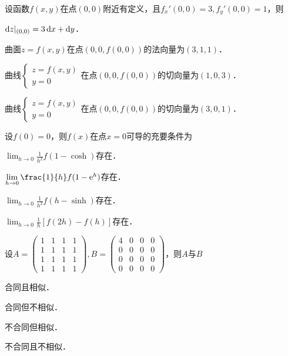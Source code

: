 \documentclass[plain,noanswer,medmath]{../../template/jnuexam}
\begin{document}
\begin{problem}
设函数$f(x,y)$在点$(0,0)$附近有定义，且$f_x'(0,0) = 3,f_y'(0,0) = 1$，则\pickout{}
\begin{abcd}
\item $\mathop{}\!\mathrm{d} z |_{(0,0)} = 3\mathop{}\!\mathrm{d} x + \mathop{}\!\mathrm{d} y$．
\item 曲面$z = f(x,y)$在点$(0,0,f(0,0))$的法向量为$(3,1,1)$．
\item 曲线$\begin{cases}
  z = f(x,y) \\
  y = 0
\end{cases}$在点$(0,0,f(0,0))$的切向量为$(1,0,3)$．
\item 曲线$\begin{cases}
  z = f(x,y) \\
  y = 0
\end{cases}$在点$(0,0,f(0,0))$的切向量为$(3,0,1)$．
\end{abcd}
\end{problem}


\begin{problem}
设$f(0) = 0$，则$f(x)$在点$x = 0$可导的充要条件为\pickout{}
\begin{abcd}
\item $\lim_{h \to 0} \frac{1}{h^2}f(1 - \cosh)$存在．
\item $\lim_{h \to 0} \frac{1}{h}f(1 - \e^h)$存在．
\item $\lim_{h \to 0} \frac{1}{h^2}f(h - \sinh)$存在．
\item $\lim_{h \to 0} \frac{1}{h}\left[f(2h) - f(h) \right]$存在．
\end{abcd}
\end{problem}


\begin{problem}
设$A = \begin{pmatrix}
  1 & 1 & 1 & 1 \\
  1 & 1 & 1 & 1 \\
  1 & 1 & 1 & 1 \\
  1 & 1 & 1 & 1
\end{pmatrix},B = \begin{pmatrix}
  4 & 0 & 0 & 0 \\
  0 & 0 & 0 & 0 \\
  0 & 0 & 0 & 0 \\
  0 & 0 & 0 & 0
\end{pmatrix}$，则$A$与$B$\pickout{}
\begin{abcd}
\item 合同且相似．
\item 合同但不相似．
\item 不合同但相似．
\item 不合同且不相似．
\end{abcd}
\end{problem}
\end{document}
